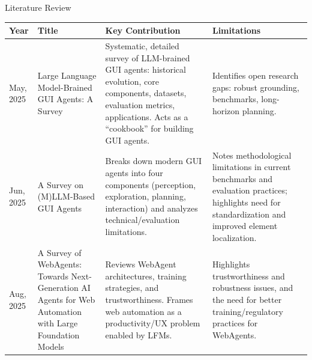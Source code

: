 \begin{frame}{Literature Review}
  \lrtable
  \begin{tabularx}{\textwidth}{p{0.7cm} p{2.8cm} X X}
    \toprule
    \textbf{Year} & \textbf{Title} & \textbf{Key Contribution} & \textbf{Limitations} \\
    \midrule
    May, 2025 \cite{zhang2025largelanguagemodelbrainedgui}
    & Large Language Model-Brained GUI Agents: A Survey
    & Systematic, detailed survey of LLM-brained GUI agents: historical evolution, core components, datasets, evaluation metrics, applications. Acts as a ``cookbook'' for building GUI agents.
    & Identifies open research gaps: robust grounding, benchmarks, long-horizon planning. \\
    \addlinespace
    Jun, 2025 \cite{tang2025surveymllmbasedguiagents}
    & A Survey on (M)LLM-Based GUI Agents
    & Breaks down modern GUI agents into four components (perception, exploration, planning, interaction) and analyzes technical/evaluation limitations.
    & Notes methodological limitations in current benchmarks and evaluation practices; highlights need for standardization and improved element localization. \\
    \addlinespace
    Aug, 2025 \cite{ning2025surveywebagentsnextgenerationai}
    & A Survey of WebAgents: Towards Next-Generation AI Agents for Web Automation with Large Foundation Models
    & Reviews WebAgent architectures, training strategies, and trustworthiness. Frames web automation as a productivity/UX problem enabled by LFMs.
    & Highlights trustworthiness and robustness issues, and the need for better training/regulatory practices for WebAgents. \\
    \bottomrule
  \end{tabularx}
\end{frame}
